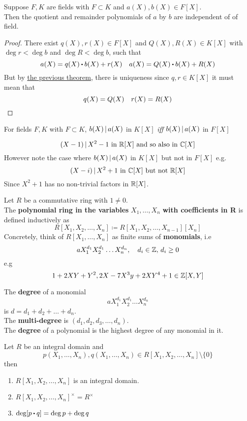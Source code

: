 \documentclass[../Main.tex]{subfiles}
\begin{document}
\begin{crl}
	Suppose $F,K$ are fields with $F\subset K$ and $a(X),b(X)\in F[X]$. \\
	Then the quotient and remainder polynomials of $a$ by $b$ are independent of of field.
\end{crl}
\begin{proof}
	There exist $q(X),r(X)\in F[X]$ and $Q(X), R(X)\in K[X]$ with $\deg r< \deg b$ and $\deg R< \deg b$, such that
	\[a(X)=q(X)\rdot b(X)+r(X)\quad a(X)=Q(X)\rdot b(X)+R(X)\]
	But by \hyperref[thm:12.8]{the previous theorem}, there is uniqueness since $q,r\in K[X]$ it must mean that
	\[q(X)=Q(X)\quad r(X)=R(X)\qedhere\]
\end{proof}
\begin{crl}
	For fields $F,K$ with $F\subset K$, $b(X) \, | \, a(X)$ in $K[X]$ \textit{iff} $b(X) \, | \, a(X)$ in $F[X]$
\end{crl}
\begin{example}
	\[(X-1) \, | \, X^2-1 \text{ in } \mathbb{R}[X] \text{ and so also in }\mathbb{C}[X]\]
	However note the case where $b(X) \, | \, a(X)$ in $K[X]$ but not in $F[X]$ e.g.
	\[(X-i) \, | \, X^2+1 \text{ in } \mathbb{C}[X] \text{ but not } \mathbb{R}[X]\]
	Since $X^2+1$ has no non-trivial factors in $\mathbb{R}[X]$.
\end{example}
\begin{dfn}[title = Multivariable Polynoimal Ring]
	Let $R$ be a commutative ring with $1\ne 0$. \\
	The \textbf{polynomial ring in the variables }$X_1,\dots,X_n$ \textbf{with coefficients in R} is defined inductively as
	\[R[X_1,X_2,\dots,X_n]\coloneqq R[X_1,X_2,\dots,X_{n-1}][X_n]\]
	Concretely, think of $R[X_1,\dots,X_n]$ as finite sums of \textbf{monomials}, i.e 
	\[aX_1^{d_1}X_2^{d_1}\dots X_n^{d_n},\quad d_i\in \mathbb{Z}, \, d_i\ge 0\]
	e.g
	\[1+2XY+Y^2,2X-7X^3y+2XY^4+1\in \mathbb{Z}[X,Y]\]
\end{dfn}
\begin{dfn}[title = {Multi-Degree}]
	The \textbf{degree} of a monomial
	\[aX_1^{d_1}X_2^{d_1}\dots X_n^{d_n}\]
	is $d=d_1+d_2+\dots+d_n$.\\
	The \textbf{multi-degree} is $(d_1,d_2,d_3,\dots,d_n)$.\\
	The \textbf{degree} of a polynomial is the highest degree of any monomial in it.
\end{dfn}
\begin{prop}
	Let $R$ be an integral domain and
	\[p(X_1,\dots,X_n),q(X_1,\dots,X_n)\in R[X_1,X_2,\dots,X_n]\setminus\{0\}\] then
	\begin{enumerate}[label=(\arabic*)]
		\item $R[X_1,X_2,\dots,X_n]$ is an integral domain.
		\item $R[X_1,X_2,\dots,X_n]^\times = R^\times$
		\item $\deg[p\rdot q]=\deg p+\deg q$
	\end{enumerate}
\end{prop}
\end{document}
